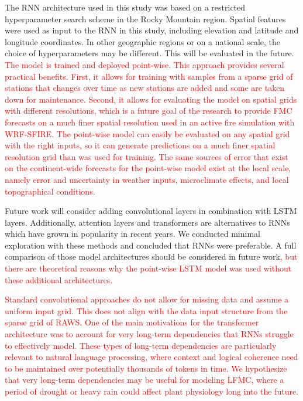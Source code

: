 \documentclass[fire,article,submit,pdftex,moreauthors]{Definitions/mdpi}
\begin{document}
The RNN architecture used in this study was based on a restricted hyperparameter search scheme in the Rocky Mountain region. Spatial features were used as input to the RNN in this study, including elevation and latitude and longitude coordinates. In other geographic regions or on a national scale, the choice of hyperparameters may be different. This will be evaluated in the future. \textcolor{red}{The model is trained and deployed point-wise. This approach provides several practical benefits. First, it allows for training with samples from a sparse grid of stations that changes over time as new stations are added and some are taken down for maintenance. Second, it allows for evaluating the model on spatial grids with different resolutions, which is a future goal of the research to provide FMC forecasts on a much finer spatial resolution used in an active fire simulation with WRF-SFIRE. The point-wise model can easily be evaluated on any spatial grid with the right inputs, so it can generate predictions on a much finer spatial resolution grid than was used for training. The same sources of error that exist on the continent-wide forecasts for the point-wise model exist at the local scale, namely error and uncertainty in weather inputs, microclimate effects, and local topographical conditions. }

Future work will consider adding convolutional layers in combination with LSTM layers. Additionally, attention layers and transformers are alternatives to RNNs which have grown in popularity in recent years. We conducted minimal exploration with these methods and concluded that RNNs were preferable. A full comparison of those model architectures should be considered in future work\textcolor{red}{, but there are theoretical reasons why the point-wise LSTM model was used without these additional architectures.}

\textcolor{red}{Standard convolutional approaches do not allow for missing data and assume a uniform input grid. This does not align with the data input structure from the sparse grid of RAWS. One of the main motivations for the transformer architecture was to account for very long-term dependencies that RNNs struggle to effectively model. These types of long-term dependencies are particularly relevant to natural language processing, where context and logical coherence need to be maintained over potentially thousands of tokens in time. We hypothesize that very long-term dependencies may be useful for modeling LFMC, where a period of drought or heavy rain could affect plant physiology long into the future.}
\end{document}
